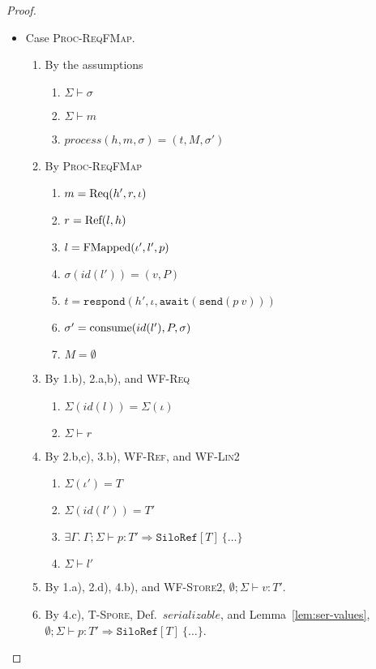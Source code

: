 \begin{proof}
\begin{itemize}
\item Case \textsc{Proc-ReqFMap}.
\begin{enumerate}
\item By the assumptions
  \begin{enumerate}[label=(\alph*)]
  \item $\Sigma \vdash \sigma$
  \item $\Sigma \vdash m$
  \item $process(h, m, \sigma) = (t, M, \sigma')$
  \end{enumerate}
\item By \textsc{Proc-ReqFMap}
  \begin{enumerate}[label=(\alph*)]
  \item $m = {\textrm{Req}(h', r, \iota)}$
  \item $r = {\textrm{Ref}(l, h)}$
  \item $l = {\textrm{FMapped}(\iota', l', p)}$
  \item $\sigma(id(l')) = (v, P)$
  \item $t = \texttt{respond}(h', \iota, \texttt{await}(\texttt{send}(p~v)))$
  \item $\sigma' = {\textrm{consume}(id(l'), P, \sigma)}$
  \item $M = \emptyset$
  \end{enumerate}
\item By 1.b), 2.a,b), and \textsc{WF-Req}
  \begin{enumerate}[label=(\alph*)]
  \item $\Sigma(id(l)) = \Sigma(\iota)$
  \item $\Sigma \vdash r$
  \end{enumerate}
\item By 2.b,c), 3.b), \textsc{WF-Ref}, and \textsc{WF-Lin2}
  \begin{enumerate}[label=(\alph*)]
  \item $\Sigma(\iota') = T$
  \item $\Sigma(id(l')) = T'$
  \item $\exists \Gamma.~\Gamma ; \Sigma \vdash p : T' \Rightarrow \texttt{SiloRef}[T]~\{\ldots\}$
  \item $\Sigma \vdash l'$
  \end{enumerate}
\item By 1.a), 2.d), 4.b), and \textsc{WF-Store2}, $\emptyset ; \Sigma \vdash v : T'$.
\item By 4.c), \textsc{T-Spore}, Def.~$serializable$, and Lemma~\ref{lem:ser-values}, $\emptyset ; \Sigma \vdash p : T' \Rightarrow \texttt{SiloRef}[T]~\{\ldots\}$.

\end{enumerate}
\end{itemize}
\end{proof}
